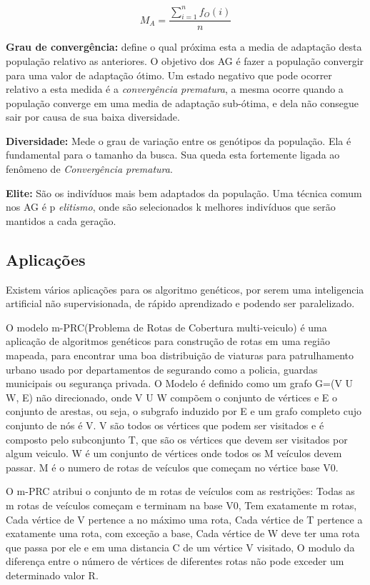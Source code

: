 \[ M_A = \frac{ \sum_{i=1}^{n} f_O(i) }{n} \]

\textbf{Grau de convergência:} define o qual próxima esta a media de adaptação desta população relativo as anteriores. O objetivo dos AG é fazer a população convergir para uma valor de adaptação ótimo.
Um estado negativo que pode ocorrer relativo a esta medida é a \textit{convergência prematura}, a mesma ocorre quando a população converge em uma media de adaptação sub-ótima, e dela não consegue sair por causa de sua baixa diversidade.

\textbf{Diversidade:} Mede o grau de variação entre os genótipos da população. Ela é fundamental para o tamanho da busca.
Sua queda esta fortemente ligada ao fenômeno de \textit{Convergência prematura}.

\textbf{Elite:} São os indivíduos mais bem adaptados da população. Uma técnica comum nos AG é p \textit{elitismo}, onde são selecionados k melhores indivíduos que serão mantidos a cada geração.

\subsection{Aplicações}
Existem vários aplicações para os algoritmo genéticos, por serem uma inteligencia artificial não supervisionada, de rápido aprendizado e podendo ser paralelizado.

O modelo m-PRC(Problema de Rotas de Cobertura multi-veiculo) é uma aplicação de algoritmos genéticos para construção de rotas em uma região mapeada, para encontrar uma boa distribuição de viaturas para patrulhamento urbano usado por departamentos de segurando como a policia, guardas municipais ou segurança privada. 
O Modelo é definido como um grafo G=(V U W, E) não direcionado, onde V U W compõem o conjunto de vértices e E o conjunto de arestas, ou seja, o subgrafo induzido por E e um grafo completo cujo conjunto de nós é V. 
V são todos os vértices que podem ser visitados e é composto pelo subconjunto T, que são os vértices que devem ser visitados por algum veiculo. W é um conjunto de vértices onde todos os M veículos devem passar. M é o numero de rotas de veículos que começam no vértice base V0. 

O m-PRC atribui o conjunto de m rotas de veículos com as restrições: Todas as m rotas de veículos começam e terminam na base V0, Tem exatamente m rotas, Cada vértice de V pertence a no máximo uma rota, Cada vértice de T pertence a exatamente uma rota, com exceção a base, Cada vértice de W deve ter uma rota que passa por ele e em uma distancia C de um vértice V visitado, O modulo da diferença entre o número de vértices de diferentes rotas não pode exceder um determinado valor R.

